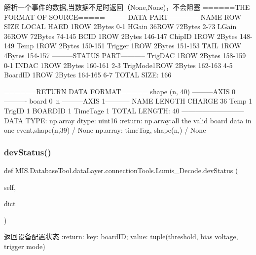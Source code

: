 \begin{DoxyVerb}解析一个事件的数据,当数据不足时返回（None,None)，不会阻塞
======THE FORMAT OF SOURCE=====
---------DATA PART-------------
NAME    ROW     SIZE    LOCAL
HAED    1ROW    2Bytes  0-1
HGain   36ROW   72Bytes 2-73
LGain   36ROW   72Bytes 74-145
BCID    1ROW    2Bytes  146-147
ChipID  1ROW    2Bytes  148-149
Temp    1ROW    2Bytes  150-151
Trigger 1ROW    2Bytes  151-153
TAIL    1ROW    4Bytes  154-157
---------STATUS PART-----------
TrigDAC 1ROW    2Bytes  158-159 0-1
INDAC   1ROW    2Bytes  160-161 2-3
TrigMode1ROW    2Bytes  162-163 4-5
BoardID 1ROW    2Bytes  164-165 6-7
TOTAL SIZE: 166

======RETURN DATA FORMAT=====
shape   (n, 40)
---------AXIS 0----------
board   0~n
---------AXIS 1-----------
NAME            LENGTH
CHARGE          36
Temp            1
TrigID          1
BOARDID         1
TimeTage        1
TOTAL LENGTH:   40
---------------------------
DATA TYPE:  np.array
dtype:      uint16
:return: np.array:all the valid board data in one event,shape(n,39) / None
np.array: timeTag, shape(n,) / None
\end{DoxyVerb}
 \mbox{\label{classMIS_1_1DatabaseTool_1_1dataLayer_1_1connectionTools_1_1Lumis__Decode_a99518aedc2ae8e974dc88593ecec63f0}} 
\subsubsection{\texorpdfstring{dev\+Status()}{devStatus()}}
{\footnotesize\ttfamily def M\+I\+S.\+Database\+Tool.\+data\+Layer.\+connection\+Tools.\+Lumis\+\_\+\+Decode.\+dev\+Status (\begin{DoxyParamCaption}\item[{}]{self,  }\item[{}]{dict }\end{DoxyParamCaption})}

\begin{DoxyVerb}返回设备配置状态
:return: key: boardID; value: tuple(threshold, bias voltage, trigger mode)
\end{DoxyVerb}
 \mbox{\label{classMIS_1_1DatabaseTool_1_1dataLayer_1_1connectionTools_1_1Lumis__Decode_a3508687b0b1a5bdb3e1667de3f18357d}} 
